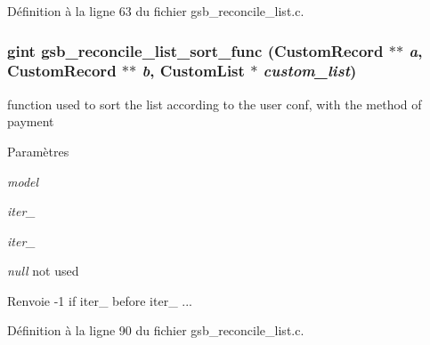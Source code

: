 Définition à la ligne 63 du fichier gsb\_\-reconcile\_\-list.c.

\subsubsection[{gsb\_\-reconcile\_\-list\_\-sort\_\-func}]{\setlength{\rightskip}{0pt plus 5cm}gint gsb\_\-reconcile\_\-list\_\-sort\_\-func ({\bf CustomRecord} $\ast$$\ast$ {\em a}, \/  {\bf CustomRecord} $\ast$$\ast$ {\em b}, \/  {\bf CustomList} $\ast$ {\em custom\_\-list})}\label{gsb__reconcile__list_8h_ab702a2bc4806b81e6d3c32c5606f2e8f}
function used to sort the list according to the user conf, with the method of payment


\begin{DoxyParams}{Paramètres}
\item[{\em model}]\item[{\em iter\_\-1}]\item[{\em iter\_\-2}]\item[{\em null}]not used\end{DoxyParams}
\begin{DoxyReturn}{Renvoie}
-\/1 if iter\_ before iter\_ ... 
\end{DoxyReturn}


Définition à la ligne 90 du fichier gsb\_\-reconcile\_\-list.c.

